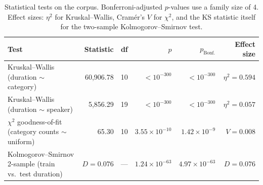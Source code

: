 \begin{table}[!t]
  \centering
  \caption{Statistical tests on the corpus. Bonferroni-adjusted
           $p$-values use a family size of 4. Effect sizes:
           $\eta^{2}$ for Kruskal--Wallis, Cram\'{e}r's $V$ for
           $\chi^{2}$, and the KS statistic itself for the
           two-sample Kolmogorov--Smirnov test.}
  \label{tab:statistical_tests}
  \small
  \begin{tabular}{lrrrrr}
  \toprule
  Test & Statistic & df & $p$ & $p_{\mathrm{Bonf.}}$ & Effect size \\
  \midrule
  Kruskal--Wallis (duration $\sim$ category)
    & 60{,}906.78 & 10  & ${<}10^{-300}$ & ${<}10^{-300}$ & $\eta^{2}=0.594$ \\
  Kruskal--Wallis (duration $\sim$ speaker)
    & 5{,}856.29  & 19  & ${<}10^{-300}$ & ${<}10^{-300}$ & $\eta^{2}=0.057$ \\
  $\chi^{2}$ goodness-of-fit (category counts $\sim$ uniform)
    & 65.30       & 10  & $3.55\!\times\!10^{-10}$ & $1.42\!\times\!10^{-9}$ & $V=0.008$ \\
  Kolmogorov--Smirnov 2-sample (train vs.\ test duration)
    & $D=0.076$   & --- & $1.24\!\times\!10^{-63}$ & $4.97\!\times\!10^{-63}$ & $D=0.076$ \\
  \bottomrule
  \end{tabular}
\end{table}

